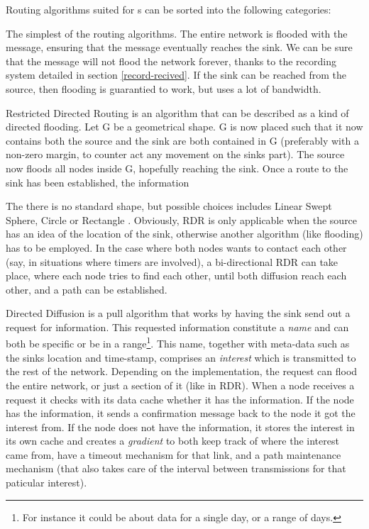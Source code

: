 \documentclass[letter, 12pt, english, draft]{article}
\begin{document}
Routing algorithms suited for \manet s can be sorted into the following categories:
\begin{description}
{The simplest of the routing algorithms. The entire network is flooded with the message, ensuring that the message eventually reaches the sink. We can be sure that the message will not flood the network forever, thanks to the recording system detailed in section \ref{record-recived}. If the sink can be reached from the source, then flooding is  guarantied to work, but uses a lot of bandwidth.} 
{\cite{larMANET, Sur2}} 


      {Restricted Directed Routing is an algorithm that can be described as a kind of directed flooding. Let G be a geometrical shape. G is now placed such that it now contains both the source and the sink are both contained in G (preferably with a non-zero margin, to counter act any movement on the sinks part). The source now floods all nodes inside G, hopefully reaching the sink. Once a route to the sink has been established, the information

The there is no standard shape, but possible choices includes Linear Swept Sphere, Circle or Rectangle . Obviously, RDR is only applicable when the source has an idea of the location of the sink, otherwise another algorithm (like flooding) has to be employed. In the case where both nodes wants to contact each other (say, in situations where timers are involved), a bi-directional RDR can take place, where each node tries to find each other, until both diffusion reach each other, and a path can be established.}
{\cite{larMANET}}

{Directed Diffusion is a pull algorithm that works by having the sink send out a request for information. This requested information constitute a \emph{name} and can both be specific or be in a range\footnote{For instance it could be about data for a single day, or a range of days.}. This name, together with meta-data such as the sinks location and time-stamp, comprises an \emph{interest} which is transmitted to the rest of the network. Depending on the implementation, the request can flood the entire network, or just a section of it (like in RDR). When a node receives a request it checks with its data cache whether it has the information. If the node has the information, it sends a confirmation message back to the node it got the interest from. If the node does not have the information, it stores the interest in its own cache and creates a \emph{gradient} to both keep track of where the interest came from, have a timeout mechanism for that link, and a path maintenance mechanism (that also takes care of the interval between transmissions for that paticular interest). 

}
\end{description}
\end{document}
